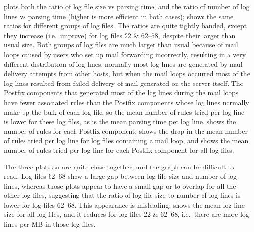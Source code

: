  plots both the ratio of log file size vs parsing time, and the
ratio of number of log lines vs parsing time (higher is more efficient in
both cases);  shows the same ratios for different groups of log files.  The
ratios are quite tightly banded, except they increase (i.e.\ improve) for
log files 22 \& 62--68, despite their larger than usual size.  Both groups
of log files are much larger than usual because of mail loops caused by
users who set up mail forwarding incorrectly, resulting in a very different
distribution of log lines: normally most log lines are generated by mail
delivery attempts from other hosts, but when the mail loops occurred most
of the log lines resulted from failed delivery of mail generated on the
server itself.  The Postfix components that generated most of the log lines
during the mail loops have fewer associated rules than the Postfix
components whose log lines normally make up the bulk of each log file, so
the mean number of rules tried per log line is lower for these log files,
as is the mean parsing time per log line.   shows the number of rules for each Postfix component;
 shows the drop in the
mean number of rules tried per log line for log files containing a mail
loop, and  shows the mean number of rules tried per log line for each
Postfix component for all log files.

The three plots on  are quite close together, and the graph can be difficult to
read.  Log files 62--68 show a large gap between log file size and number
of log lines, whereas those plots appear to have a small gap or to overlap
for all the other log files, suggesting that the ratio of log file size to
number of log lines is lower for log files 62--68.  This appearance is
misleading:  shows the mean log line
size for all \numberOFlogFILES{} log files, and it reduces for log files 22
\& 62--68, i.e.\ there are more log lines per MB in those log files.


